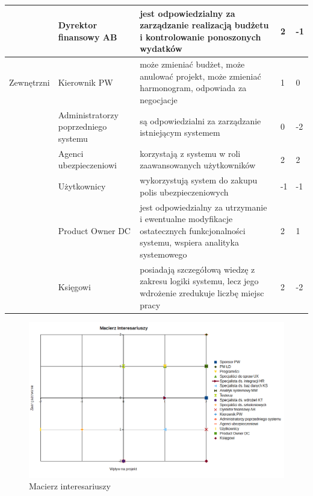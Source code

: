 \documentclass{article}
\begin{document}
\begin{longtable}{|l|L{0.2\textwidth}|L{0.58\textwidth}|C{0.15\textwidth}|C{0.15\textwidth}|}
 & Dyrektor finansowy AB & jest odpowiedzialny za zarządzanie realizacją budżetu i kontrolowanie ponoszonych wydatków & 2 & -1 \\ \hline
Zewnętrzni & Kierownik PW & może zmieniać budżet, może anulować projekt, może zmieniać harmonogram, odpowiada za negocjacje & 1 & 0 \\ \hline
 & Administratorzy poprzedniego systemu & są odpowiedzialni za zarządzanie istniejącym systemem & 0 & -2 \\ \hline
 & Agenci ubezpieczeniowi & korzystają z systemu w roli zaawansowanych użytkowników & 2 & 2 \\ \hline
 & Użytkownicy & wykorzystują system do zakupu polis ubezpieczeniowych & -1 & -1 \\ \hline
 & Product Owner DC & jest odpowiedzialny za utrzymanie i ewentualne modyfikacje ostatecznych funkcjonalności systemu, wspiera analityka systemowego & 2 & 1 \\ \hline
 & Księgowi & posiadają szczegółową wiedzę z zakresu logiki systemu, lecz jego wdrożenie zredukuje liczbę miejsc pracy & 2 & -2 \\ \hline
\end{longtable}

\begin{figure}[h]
    \centering
    \includegraphics[scale=0.6]{macierz_interesariuszy.png}
    \caption{Macierz interesariuszy}
\end{figure}
\end{document}
